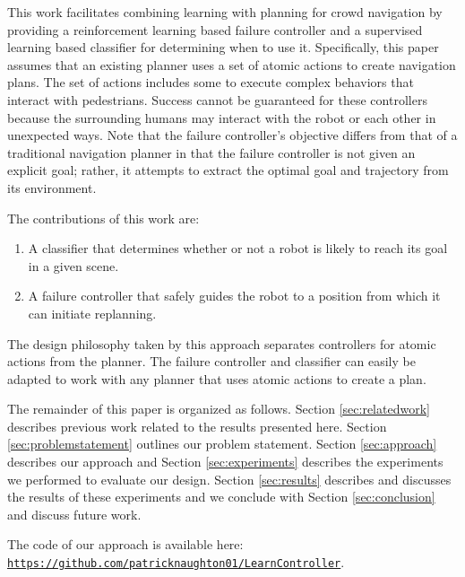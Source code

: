 \documentclass[letterpaper, 10 pt, conference]{ieeeconf}  %
\begin{document}
	This work facilitates combining learning with planning for crowd navigation by providing a reinforcement learning based failure controller and a supervised learning based classifier for determining when to use it. Specifically, this paper assumes that an existing planner uses a set of atomic actions to create navigation plans. The set of actions includes some to execute complex behaviors that interact with pedestrians. Success cannot be guaranteed for these controllers because the surrounding humans may interact with the robot or each other in unexpected ways. Note that the failure controller's objective differs from that of a traditional navigation planner in that the failure controller is not given an explicit goal; rather, it attempts to extract the optimal goal and trajectory from its environment.

	The contributions of this work are:
	\begin{enumerate}
		\item A classifier that determines whether or not a robot is likely to reach its goal in a given scene.
		\item A failure controller that safely guides the robot to a position from which it can initiate replanning.
	\end{enumerate}
	The design philosophy taken by this approach separates controllers for atomic actions from the planner. The failure controller and classifier can easily be adapted to work with any planner that uses atomic actions to create a plan.
	
	The remainder of this paper is organized as follows. Section \ref{sec:relatedwork} describes previous work related to the results presented here. Section \ref{sec:problemstatement} outlines our problem statement. Section \ref{sec:approach} describes our approach and Section \ref{sec:experiments} describes the experiments we performed to evaluate our design. Section \ref{sec:results} describes and discusses the results of these experiments and we conclude with Section \ref{sec:conclusion} and discuss future work.
	
	The code of our approach is available here: \texttt{\url{https://github.com/patricknaughton01/LearnController}}.
	
\end{document}
